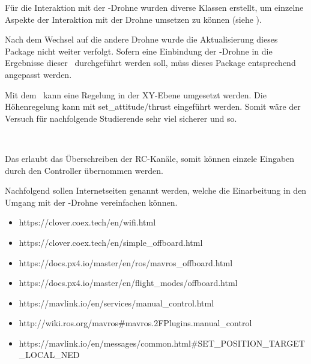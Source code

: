 























Für die Interaktion mit der \COEX-Drohne wurden diverse Klassen erstellt, um einzelne Aspekte der Interaktion mit der Drohne umsetzen zu können (siehe ).

Nach dem Wechsel auf die andere Drohne wurde die Aktualisierung dieses Package nicht weiter verfolgt. Sofern eine Einbindung der \COEX-Drohne in die Ergebnisse dieser \Arbeit\ durchgeführt werden soll, müss dieses Package entsprechend angepasst werden.




Mit dem  \missing\ kann eine Regelung in der XY-Ebene umgesetzt werden. Die Höhenregelung kann mit set\_attitude/thrust eingeführt werden.
Somit wäre der Versuch für nachfolgende Studierende sehr viel sicherer und so.


\missing\


Das  erlaubt das Überschreiben der RC-Kanäle, somit können einzele Eingaben durch den Controller übernommen werden.
\missing\





Nachfolgend sollen Internetseiten genannt werden, welche die Einarbeitung in den Umgang mit der \COEX-Drohne vereinfachen können.

\begin{itemize}
\item https://clover.coex.tech/en/wifi.html

\item https://clover.coex.tech/en/simple\_offboard.html
\item https://docs.px4.io/master/en/ros/mavros\_offboard.html
\item https://docs.px4.io/master/en/flight\_modes/offboard.html

\item https://mavlink.io/en/services/manual\_control.html
\item http://wiki.ros.org/mavros\#mavros.2FPlugins.manual\_control

\item https://mavlink.io/en/messages/common.html\#SET\_POSITION\_TARGET\_LOCAL\_NED
\end{itemize}

